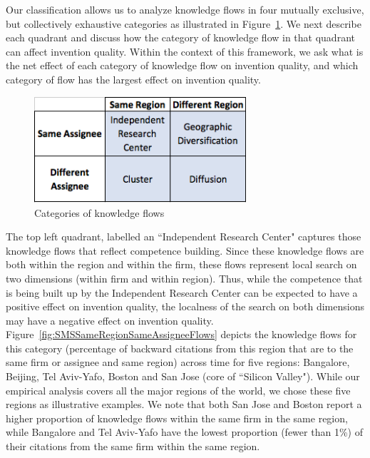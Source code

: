\documentclass[12pt,letterpaper]{article}
\begin{document}
Our classification allows us to analyze knowledge flows in four mutually exclusive, but collectively exhaustive categories as illustrated in Figure~\ref{fig:2x2}. We next describe each quadrant and discuss how the category of knowledge flow in that quadrant can affect invention quality. Within the context of this framework, we ask what is the net effect of each category of knowledge flow on invention quality, and which category of flow has the largest effect on invention quality. \par
\begin{figure}[h!]
\begin{centering}
  \caption{Categories of knowledge flows}
  \label{fig:2x2}
  \includegraphics[width=0.7\textwidth]{2x2}
\end{centering}
\end{figure}

The top left quadrant, labelled an ``Independent Research Center" captures those knowledge flows that reflect competence building. Since these knowledge flows  are both within the region and within the firm, these flows represent local search on two dimensions (within firm and within region).  Thus, while the competence that is being built up by the Independent Research Center can be expected to have a positive effect on invention quality, the localness of the search on both dimensions may have a negative effect on invention quality. Figure~\ref{fig:SMSSameRegionSameAssigneeFlows} depicts the knowledge flows for this category (percentage of backward citations from this region that are to the same firm or assignee and same region) across time for five regions: Bangalore, Beijing, Tel Aviv-Yafo, Boston and San Jose (core of ``Silicon Valley"). While our empirical analysis covers all the major regions of the world, we chose these five regions as illustrative examples. We note that both San Jose and Boston report a higher proportion of knowledge flows within the same firm in the same region, while Bangalore and Tel Aviv-Yafo have the lowest proportion (fewer than 1\%) of their citations from the same firm within the same region. \par
\end{document}
